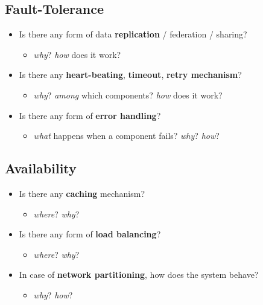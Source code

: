 \documentclass{scrartcl}
\begin{document}
\subsection{Fault-Tolerance}\label{fault-tolerance}

\begin{itemize}
  \item Is there any form of data \textbf{replication} / federation / sharing?
  \begin{itemize}
    \item \emph{why}? \emph{how} does it work?
  \end{itemize}
  
  \item Is there any \textbf{heart-beating}, \textbf{timeout}, \textbf{retry mechanism}?
  \begin{itemize}
    \item \emph{why}? \emph{among} which components? \emph{how} does it work?
  \end{itemize}
  
  \item Is there any form of \textbf{error handling}?
  \begin{itemize}
    \item \emph{what} happens when a component fails? \emph{why}? \emph{how}?
  \end{itemize}
\end{itemize}

\subsection{Availability}\label{availability}

\begin{itemize}
  \item Is there any \textbf{caching} mechanism?
  \begin{itemize}
    \item \emph{where}? \emph{why}?
  \end{itemize}
  
  \item Is there any form of \textbf{load balancing}?
  \begin{itemize}
    \item \emph{where}? \emph{why}?
  \end{itemize}

  \item In case of \textbf{network partitioning}, how does the system behave?
  \begin{itemize}
    \item \emph{why}? \emph{how}?
  \end{itemize}
\end{itemize}
\end{document}
